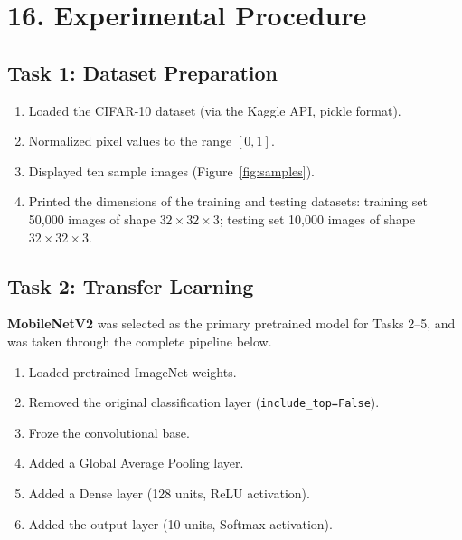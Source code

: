 \documentclass[11pt]{article}
\begin{document}

\section*{16. Experimental Procedure}

\subsection*{Task 1: Dataset Preparation}

\begin{enumerate}

\item Loaded the CIFAR-10 dataset (via the Kaggle API, pickle format).

\item Normalized pixel values to the range $[0,1]$.

\item Displayed ten sample images (Figure~\ref{fig:samples}).

\item Printed the dimensions of the training and testing datasets: training
set 50{,}000 images of shape $32\times32\times3$; testing set 10{,}000
images of shape $32\times32\times3$.

\end{enumerate}


\subsection*{Task 2: Transfer Learning}

\textbf{MobileNetV2} was selected as the primary pretrained model for
Tasks 2--5, and was taken through the complete pipeline below.

\begin{enumerate}

\item Loaded pretrained ImageNet weights.

\item Removed the original classification layer (\texttt{include\_top=False}).

\item Froze the convolutional base.

\item Added a Global Average Pooling layer.

\item Added a Dense layer (128 units, ReLU activation).

\item Added the output layer (10 units, Softmax activation).

\end{enumerate}
\end{document}
